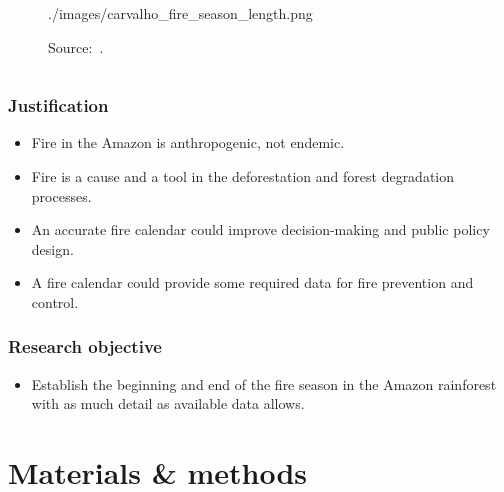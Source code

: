 \documentclass[aspectratio=169]{beamer}
\begin{document}
\begin{frame}
\begin{columns}
\begin{column}{0.5\linewidth}
\begin{figure}[h]
                {./images/carvalho_fire_season_length.png}
                \caption{Source:~\cite{carvalho2021}.}
            \end{figure}
        \end{column}
    \end{columns}
\end{frame}


\begin{frame}
    \frametitle{Justification}
    \begin{itemize}
        \item Fire in the Amazon is anthropogenic, not endemic.
        \item Fire is a cause and a tool in the deforestation and forest 
            degradation processes.
        \item An accurate fire calendar could improve decision-making and
            public policy design.
        \item A fire calendar could provide some required data for fire
            prevention and control.
    \end{itemize}
\end{frame}

\begin{frame}
    \frametitle{Research objective}
    \begin{itemize}
        \item Establish the beginning and end of the fire season in the Amazon
            rainforest with as much detail as available data allows.
    \end{itemize}
\end{frame}

\section{Materials \& methods}
\end{document}
